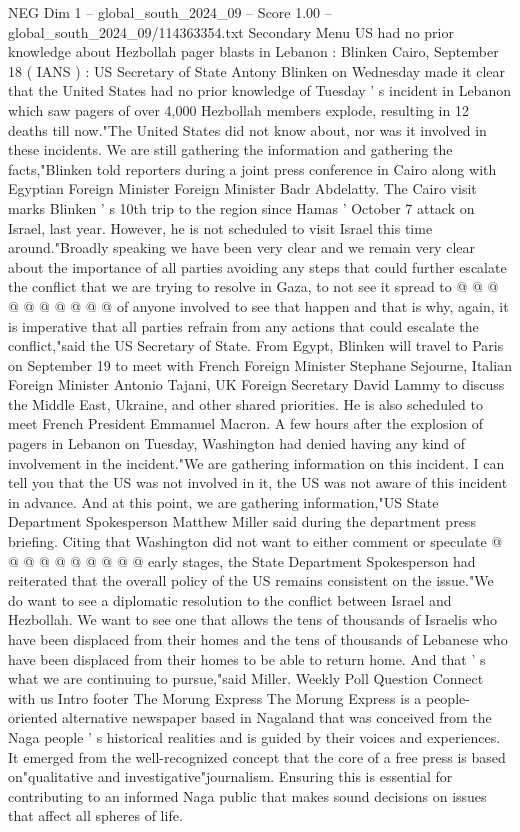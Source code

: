 \begin{textsample}{NEG Dim 1 – global\_south\_2024\_09 – Score 1.00 – global\_south\_2024\_09/114363354.txt}  \label{ex:f1_neg_242}
Secondary Menu US had no prior knowledge about Hezbollah pager blasts in Lebanon : Blinken Cairo, September 18 ( IANS ) : US Secretary of State Antony Blinken on Wednesday made it clear that the United States had no prior knowledge of Tuesday ' s incident in Lebanon which saw pagers of over 4,000 Hezbollah members explode, resulting in 12 deaths till now."The United States did not know about, nor was it involved in these incidents.
We are still gathering the information and gathering the facts,"Blinken told reporters during a joint press conference in Cairo along with Egyptian Foreign Minister Foreign Minister Badr Abdelatty.
The Cairo visit marks Blinken ' s 10th trip to the region since Hamas ' October 7 attack on Israel, last year.
However, he is not scheduled to visit Israel this time around."Broadly speaking we have been very clear and we remain very clear about the importance of all parties avoiding any steps that could further escalate the conflict that we are trying to resolve in Gaza, to not see it spread to @ @ @ @ @ @ @ @ @ @ of anyone involved to see that happen and that is why, again, it is imperative that all parties refrain from any actions that could escalate the conflict,"said the US Secretary of State.
From Egypt, Blinken will travel to Paris on September 19 to meet with French Foreign Minister Stephane Sejourne, Italian Foreign Minister Antonio Tajani, UK Foreign Secretary David Lammy to discuss the Middle East, Ukraine, and other shared priorities.
He is also scheduled to meet French President Emmanuel Macron.
A few hours after the explosion of pagers in Lebanon on Tuesday, Washington had denied having any kind of involvement in the incident."We are gathering information on this incident.
I can tell you that the US was not involved in it, the US was not aware of this incident in advance.
And at this point, we are gathering information,"US State Department Spokesperson Matthew Miller said during the department press briefing.
Citing that Washington did not want to either comment or speculate @ @ @ @ @ @ @ @ @ @ early stages, the State Department Spokesperson had reiterated that the overall policy of the US remains consistent on the issue."We do want to see a diplomatic resolution to the conflict between Israel and Hezbollah.
We want to see one that allows the tens of thousands of Israelis who have been displaced from their homes and the tens of thousands of Lebanese who have been displaced from their homes to be able to return home.
And that ' s what we are continuing to pursue,"said Miller.
Weekly Poll Question Connect with us Intro footer The Morung Express The Morung Express is a people-oriented alternative newspaper based in Nagaland that was conceived from the Naga people ' s historical realities and is guided by their voices and experiences.
It emerged from the well-recognized concept that the core of a free press is based on"qualitative and investigative"journalism.
Ensuring this is essential for contributing to an informed Naga public that makes sound decisions on issues that affect all spheres of life.

\end{textsample}
